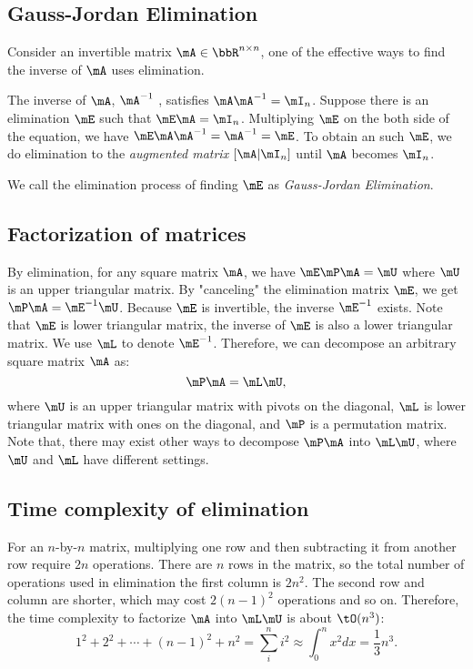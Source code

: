 \documentclass[11pt]{article}
\theoremstyle{plain}
\theoremstyle{definition}
\begin{document}
\subsection{Gauss-Jordan Elimination}
Consider an invertible matrix $\mA \in \bbR^{n \times n}$, one of the effective ways to find the inverse of $\mA$ uses elimination. 

\vspace{0.2cm}
 The inverse of $\mA$, $\mA^{-1}$ , satisfies $\mA \mA^{-1} = \mI_n$. Suppose there is an elimination $\mE$ such that $\mE \mA = \mI_n$. Multiplying $\mE$ on the both side of the equation, we have $\mE  \mA \mA^{-1}= \mA^{-1} = \mE$. To obtain an such $\mE$, we do elimination to the \textit{augmented matrix} $[\mA|\mI_n]$ until $\mA$ becomes $\mI_n$. 
 
 \vspace{0.2cm}
 We call the elimination process of finding $\mE$ as \textit{Gauss-Jordan Elimination}.



\subsection{Factorization of matrices}
By elimination, for any square matrix $\mA$, we have $\mE \mP \mA = \mU$ where $\mU$ is an upper triangular matrix. By "canceling" the elimination matrix $\mE$, we get $\mP \mA = \mE^{-1} \mU$. Because $\mE$ is invertible, the inverse $\mE^{-1}$ exists. Note that $\mE$ is lower triangular matrix, the inverse of $\mE$ is also a lower triangular matrix. We use $\mL$ to denote $\mE^{-1}$. Therefore, we can decompose an arbitrary square matrix $\mA$ as:
\[ \mP \mA = \mL \mU, \]
where $\mU$ is an upper triangular matrix with pivots on the diagonal, $\mL$ is lower triangular matrix with ones on the diagonal, and $\mP$ is a permutation matrix. Note that, there may exist other ways to decompose $\mP\mA$ into $\mL \mU$, where $\mU$ and $\mL$ have different settings.

\subsection{Time complexity of elimination}
For an $n$-by-$n$ matrix, multiplying one row and then subtracting it from another row require $2n$ operations. There are $n$ rows in the matrix, so the total number of operations used in elimination the first column is $2n^2$. The second row and column are shorter, which may cost $2(n-1)^2$ operations  and so on. Therefore, the time complexity to factorize $\mA$ into $\mL \mU$ is about $\tO(n^3)$: \[ 1^2 + 2^2 + \cdots +(n-1)^2 + n^2 = \sum_{i}^n i^2 \approx \int_{0}^n x^2 dx = \frac{1}{3} n^3.\]
\end{document}
